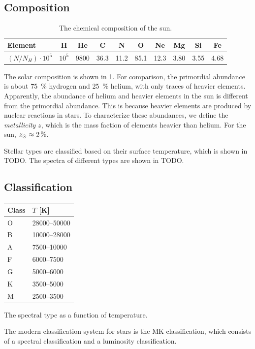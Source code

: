 \subsection{Composition}
\begin{table}
	\begin{tabular}{lccccccccc}
	\toprule
	Element & H & He & C & N & O & Ne & Mg & Si & Fe\\
	\midrule
	$(N/N_H) \cdot 10^5$ & $10^5$ & 9800 & 36.3 & 11.2 & 85.1 & 12.3 & 3.80 & 3.55 & 4.68\\
	\bottomrule
	\end{tabular}
	\caption{The chemical composition of the sun.}
	\label{tab:solar-comp}
\end{table}
The solar composition is shown in \cref{tab:solar-comp}.
For comparison, the primordial abundance is about \SI{75}{\percent} hydrogen and \SI{25}{\percent} helium, with only traces of heavier elements.
Apparently, the abundance of helium and heavier elements in the sun is different from the primordial abundance.
This is because heavier elements are produced by nuclear reactions in stars.
To characterize these abundances, we define the \emph{metallicity} $z$, which is the mass faction of elements heavier than helium.
For the sun, $z_\odot \approx \SI{2}{\percent}$.

Stellar types are classified based on their surface temperature, which is shown in TODO.
The spectra of different types are shown in TODO.


\subsection{Classification}
\begin{margintable}
	\begin{tabular}{ll}
		\toprule
		Class & $T$ [K]\\
		\midrule
		O & \num{28000}--\num{50000}\\
		B & \num{10000}--\num{28000}\\
		A & \num{7500}--\num{10000}\\
		F & \num{6000}--\num{7500}\\
		G & \num{5000}--\num{6000}\\
		K & \num{3500}--\num{5000}\\
		M & \num{2500}--\num{3500}\\
		\bottomrule
	\end{tabular}
	\caption{The spectral type as a function of temperature.}
	\label{tab:spectral-type}
\end{margintable}
The modern classification system for stars is the MK classification, which consists of a spectral classification and a luminosity classification.


